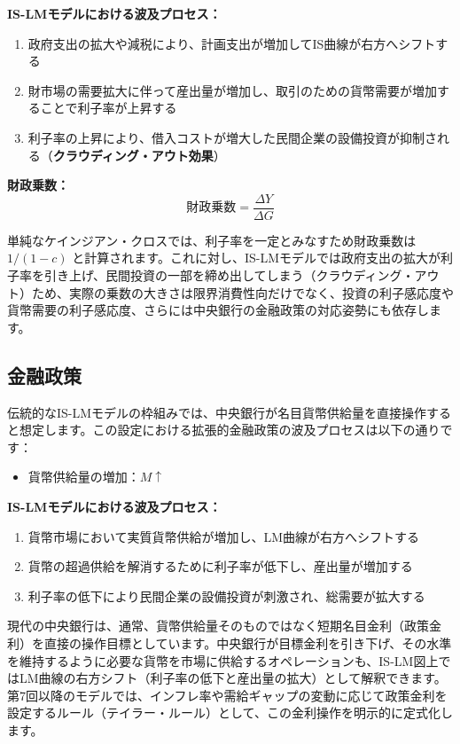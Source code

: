 \documentclass[
  japanese,
  lualatex,
  ja=standard,
  12pt,
  a4paper]{ltjsarticle}
\providecommand{\tightlist}{%
  \setlength{\itemsep}{0pt}\setlength{\parskip}{0pt}}
\begin{document}
\textbf{IS-LMモデルにおける波及プロセス：}

\begin{enumerate}
\def\labelenumi{\arabic{enumi}.}
\tightlist
\item
  政府支出の拡大や減税により、計画支出が増加してIS曲線が右方へシフトする
\item
  財市場の需要拡大に伴って産出量が増加し、取引のための貨幣需要が増加することで利子率が上昇する
\item
  利子率の上昇により、借入コストが増大した民間企業の設備投資が抑制される（\textbf{クラウディング・アウト効果}）
\end{enumerate}

\textbf{財政乗数：} \[
\text{財政乗数} = \frac{\Delta Y}{\Delta G}
\]

単純なケインジアン・クロスでは、利子率を一定とみなすため財政乗数は
\(1/(1-c)\)
と計算されます。これに対し、IS-LMモデルでは政府支出の拡大が利子率を引き上げ、民間投資の一部を締め出してしまう（クラウディング・アウト）ため、実際の乗数の大きさは限界消費性向だけでなく、投資の利子感応度や貨幣需要の利子感応度、さらには中央銀行の金融政策の対応姿勢にも依存します。

\subsection{金融政策}\label{ux91d1ux878dux653fux7b56}

伝統的なIS-LMモデルの枠組みでは、中央銀行が名目貨幣供給量を直接操作すると想定します。この設定における拡張的金融政策の波及プロセスは以下の通りです：

\begin{itemize}
\tightlist
\item
  貨幣供給量の増加：\(M \uparrow\)
\end{itemize}

\textbf{IS-LMモデルにおける波及プロセス：}

\begin{enumerate}
\def\labelenumi{\arabic{enumi}.}
\tightlist
\item
  貨幣市場において実質貨幣供給が増加し、LM曲線が右方へシフトする
\item
  貨幣の超過供給を解消するために利子率が低下し、産出量が増加する
\item
  利子率の低下により民間企業の設備投資が刺激され、総需要が拡大する
\end{enumerate}

現代の中央銀行は、通常、貨幣供給量そのものではなく短期名目金利（政策金利）を直接の操作目標としています。中央銀行が目標金利を引き下げ、その水準を維持するように必要な貨幣を市場に供給するオペレーションも、IS-LM図上ではLM曲線の右方シフト（利子率の低下と産出量の拡大）として解釈できます。第7回以降のモデルでは、インフレ率や需給ギャップの変動に応じて政策金利を設定するルール（テイラー・ルール）として、この金利操作を明示的に定式化します。
\end{document}

